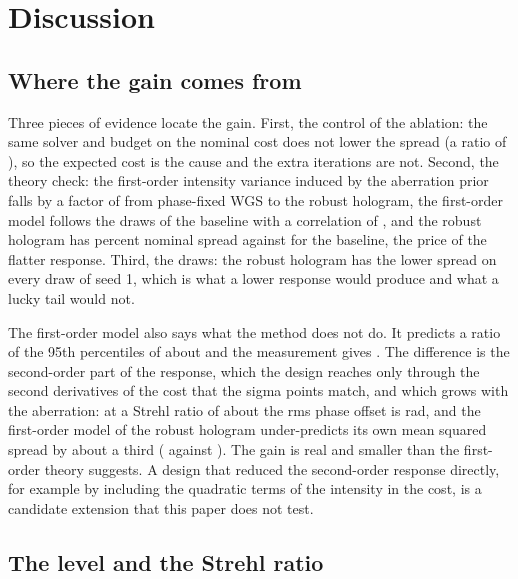 \section{Discussion}\label{sec:discussion}

\subsection{Where the gain comes from}

Three pieces of evidence locate the gain. First, the control of the ablation: the same solver and budget on the nominal cost does not lower the spread (a ratio of \ablNominalMed), so the expected cost is the cause and the extra iterations are not. Second, the theory check: the first-order intensity variance induced by the aberration prior falls by a factor of \thPRatio{} from phase-fixed WGS to the robust hologram, the first-order model follows the draws of the baseline with a correlation of \thPearsonNom, and the robust hologram has \thSigmaZeroBfour{} percent nominal spread against \thSigmaZeroNom{} for the baseline, the price of the flatter response.
Third, the draws: the robust hologram has the lower spread on every draw of seed 1, which is what a lower response would produce and what a lucky tail would not.

The first-order model also says what the method does not do. It predicts a ratio of the 95th percentiles of about \thQLinRatio{} and the measurement gives \ratioMed. The difference is the second-order part of the response, which the design reaches only through the second derivatives of the cost that the sigma points match, and which grows with the aberration: at a Strehl ratio of about \strehlExp{} the rms phase offset is \phaseRms{} rad, and the first-order model of the robust hologram under-predicts its own mean squared spread by about a third
(\thPredSqBfour{} against \thMeasSqBfour). The gain is real and smaller than the first-order theory suggests. A design that reduced the second-order response directly, for example by including the quadratic terms of the intensity in the cost, is a candidate extension that this paper does not test.

\subsection{The level and the Strehl ratio}

